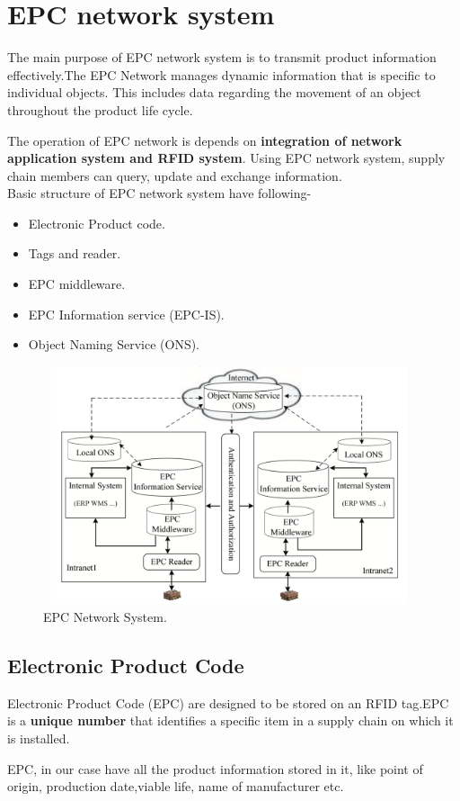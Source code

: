 \documentclass[12pt, a4paper]{report}
\begin{document}
\section{EPC network system}
The main purpose of EPC network system is to transmit product information effectively.The EPC Network manages dynamic information that is specific to individual objects. This includes data regarding the movement of an object throughout the product life cycle. \par The operation of EPC network is depends on \textbf{integration of network application system and RFID system}. Using EPC network system, supply chain members can query, update and exchange information. \\Basic structure of EPC network system have following-
\begin{itemize}
    \item Electronic Product code.
    \item Tags and reader.
    \item EPC middleware.
    \item EPC Information service (EPC-IS).
    \item Object Naming Service (ONS).
\end{itemize}
\begin{figure}[h]
\centering
\includegraphics[width=11cm,height=7cm]{EPC}			%
\caption{EPC Network System.\cite{yan2009supply}}
\label{figure-7}
\end{figure}
\subsection{Electronic Product Code}
Electronic Product Code (EPC) are designed to be stored on an RFID tag.EPC is a \textbf{unique number} that identifies a specific item in a supply chain on which it is installed. \par EPC, in our case have all the product information stored in it, like point of origin, production date,viable life, name of manufacturer etc.
\end{document}
